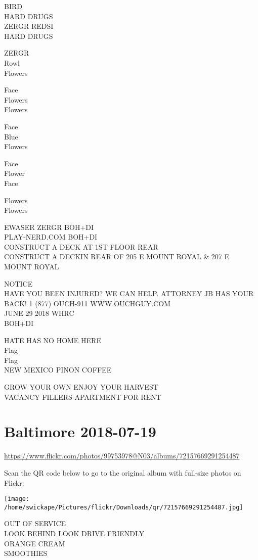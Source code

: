 \documentclass[10pt,letterpaper]{article}
\begin{document}
BIRD\\
HARD DRUGS\\
ZERGR REDSI\\
HARD DRUGS

ZERGR\\
Rowl\\
Flowers

Face\\
Flowers\\
Flowers

Face\\
Blue\\
Flowers

Face\\
Flower\\
Face

Flowers\\
Flowers

EWASER ZERGR BOH+DI\\
PLAY{-}NERD.COM BOH+DI\\
CONSTRUCT A DECK AT 1ST FLOOR REAR\\
CONSTRUCT A DECKIN REAR OF 205 E MOUNT ROYAL \& 207 E MOUNT ROYAL

NOTICE\\
HAVE YOU BEEN INJURED?  WE CAN HELP.  ATTORNEY JB HAS YOUR BACK!  1 (877) OUCH{-}911 WWW.OUCHGUY.COM\\
JUNE 29 2018 WHRC\\
BOH+DI

HATE HAS NO HOME HERE\\
Flag\\
Flag\\
NEW MEXICO PINON COFFEE

GROW YOUR OWN ENJOY YOUR HARVEST\\
VACANCY FILLERS APARTMENT FOR RENT


\section*{Baltimore 2018-07-19}

\url{https://www.flickr.com/photos/99753978@N03/albums/72157669291254487}

Scan the QR code below to go to the original album with full-size photos on Flickr:

\texttt{[image: /home/swickape/Pictures/flickr/Downloads/qr/72157669291254487.jpg]}


OUT OF SERVICE\\
LOOK BEHIND LOOK DRIVE FRIENDLY\\
ORANGE CREAM\\
SMOOTHIES
\end{document}
